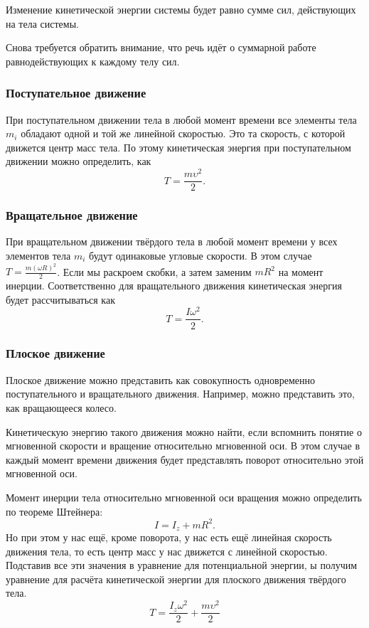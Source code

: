 \begin{theorem}%
	\label{thrm:kinetic-energy}
	Изменение кинетичес\-кой энергии системы будет равно сумме сил, действующих на
	тела системы.
\end{theorem}

Снова требуется обратить внимание, что речь идёт о суммарной работе
равнодействующих к каждому телу сил.

\subsubsection{Поступательное движение}
При поступательном движении тела в любой момент времени все элементы тела $m_i$
обладают одной и той же линейной скоростью. Это та скорость, с которой движется
центр масс тела. По этому кинетическая энергия при поступательном движении
можно определить, как \[
	T = \frac{m \upsilon^2}{2}
	.\]

\subsubsection{Вращательное движение}
При вращательном движении твёрдого тела в любой момент времени у всех элементов
тела $m_i$ будут одинаковые угловые скорости. В этом случае \( T = \frac{m
	(\omega R)^2}{2} \). Если мы раскроем скобки, а затем заменим \( m R^2 \) на
момент инерции. Соответственно для вращательного движения кинетическая энергия
будет рассчитываться как \[
	T = \frac{I \omega^2}{2}
	.\]

\subsubsection{Плоское движение}

Плоское движение можно представить как совокупность одновременно
поступательного и вращательного движения. Например, можно представить это, как
вращающееся колесо.

Кинетическую энергию такого движения можно найти, если вспомнить понятие о
мгновенной скорости и вращение относительно мгновенной оси. В этом случае в
каждый момент времени движения будет представлять поворот относительно этой
мгновенной оси.

Момент инерции тела относительно мгновенной оси вращения можно определить по
теореме Штейнера: \[
	I = I_z + mR^2
	.\] Но при этом у нас ещё, кроме поворота, у нас есть ещё линейная скорость
движения тела, то есть центр масс у нас движется с линейной скоростью. Подставив
все эти значения в уравнение для потенциальной энергии, ы получим уравнение для
расчёта кинетической энергии для плоского движения твёрдого тела.
\begin{equation}
	T = \frac{I_z \omega^2}{2} + \frac{m \upsilon^2}{2}
\end{equation}

